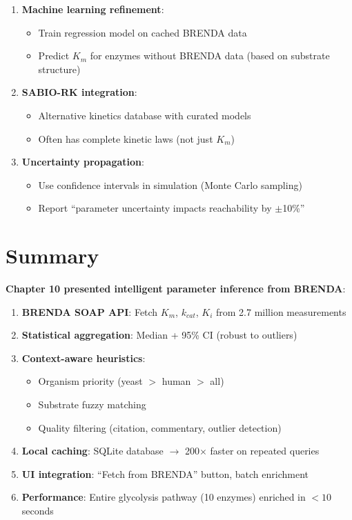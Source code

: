 \begin{enumerate}
    \item \textbf{Machine learning refinement}:
    \begin{itemize}
        \item Train regression model on cached BRENDA data
        \item Predict $K_m$ for enzymes without BRENDA data (based on substrate structure)
    \end{itemize}
    
    \item \textbf{SABIO-RK integration}:
    \begin{itemize}
        \item Alternative kinetics database with curated models
        \item Often has complete kinetic laws (not just $K_m$)
    \end{itemize}
    
    \item \textbf{Uncertainty propagation}:
    \begin{itemize}
        \item Use confidence intervals in simulation (Monte Carlo sampling)
        \item Report ``parameter uncertainty impacts reachability by $\pm$10\%''
    \end{itemize}
\end{enumerate}

\section{Summary}
\label{sec:brenda-summary}

\textbf{Chapter 10 presented intelligent parameter inference from BRENDA}:

\begin{enumerate}
    \item \textbf{BRENDA SOAP API}: Fetch $K_m$, $k_{cat}$, $K_i$ from 2.7 million measurements
    \item \textbf{Statistical aggregation}: Median + 95\% CI (robust to outliers)
    \item \textbf{Context-aware heuristics}:
    \begin{itemize}
        \item Organism priority (yeast $>$ human $>$ all)
        \item Substrate fuzzy matching
        \item Quality filtering (citation, commentary, outlier detection)
    \end{itemize}
    \item \textbf{Local caching}: SQLite database $\to$ 200$\times$ faster on repeated queries
    \item \textbf{UI integration}: ``Fetch from BRENDA'' button, batch enrichment
    \item \textbf{Performance}: Entire glycolysis pathway (10 enzymes) enriched in $<10$ seconds
\end{enumerate}

